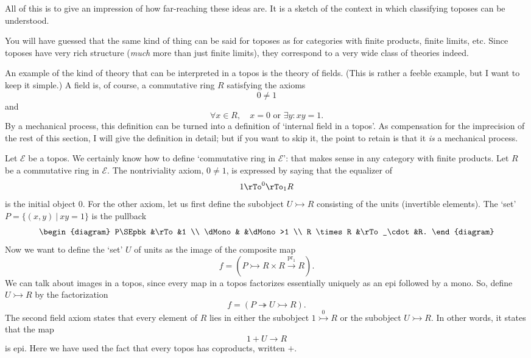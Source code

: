 \documentclass{article}
\newcommand{\cat}[1]{\mathscr{#1}}
\newcommand{\such}{\:|\:}
\newcommand{\parpair}[2]{\pile{\rTo^{\scriptstyle #1}\\ 
\rTo_{\scriptstyle #2}}}
\newcommand{\pr}{\mathrm{pr}}
\newcommand{\E}{\cat{E}}
\newcommand{\toby}[1]{\stackrel{#1}{\to}}
\newcommand{\monic}{\rightarrowtail}
\newcommand{\monicby}[1]{\stackrel{#1}{\monic}}
\newcommand{\epic}{\twoheadrightarrow}
\newcommand{\cln}{\colon}
\begin{document}
All of this is to give an impression of how far-reaching these ideas
are.  It is a sketch of the context in which classifying toposes can be
understood.

You will have guessed that the same kind of thing can be said for toposes as
for categories with finite products, finite limits, etc.  Since toposes have
very rich structure (\emph{much} more than just finite limits), they
correspond to a very wide class of theories indeed.  

An example of the kind of theory that can be interpreted in a topos is the
theory of fields.  (This is rather a feeble example, but I want to
keep it simple.)  A field is, of course, a commutative ring $R$ satisfying the
axioms 
% 
\begin{equation}        \label{eq:field-nontriv}
0 \neq 1
\end{equation}
% 
and
% 
\begin{equation}        \label{eq:field-main}
\forall x \in R, 
\quad 
x = 0 \textrm{ or } \exists y\cln xy = 1.
\end{equation}
% 
By a mechanical process, this definition can be turned into a definition of
`internal field in a topos'.  As compensation for the imprecision of the rest
of this section, I will give the definition in detail; but if you want to skip
it, the point to retain is that it \emph{is} a mechanical process.

Let $\E$ be a topos.  We certainly know how to define `commutative ring in
$\E$': that makes sense in any category with finite products.  Let $R$ be a
commutative ring in $\E$.  The nontriviality axiom, $0 \neq 1$, is expressed
by saying that 
% 
the equalizer of
\[
1 \parpair{0}{1} R
\]
is the initial object $0$.  For the other axiom, let us first define the
subobject $U \monic R$ consisting of the units (invertible elements).  The
`set' $P = \{ (x, y) \such xy = 1 \}$ is the pullback
\[
\begin{diagram}
P\SEpbk         &\rTo           &1              \\
\dMono          &               &\dMono>1       \\
R \times R      &\rTo_\cdot     &R.
\end{diagram}
\]
Now we want to define the `set' $U$ of units as the image of the composite map 
\[
f 
= 
\left(
P \monic R \times R \toby{\pr_1} R
\right).
\]
We can talk about images in a topos, since every map in a topos
factorizes essentially uniquely as an epi followed by a mono.  So, define $U
\monic R$ by the factorization
\[
f 
=
\left(
P \epic U \monic R
\right).
\]
The second field axiom states that every element of $R$ lies in either the
subobject $1 \monicby{0} R$ or the subobject $U \monic R$.  In other words, it
states that the map
\[
1 + U \to R
\]
is epi.  Here we have used the fact that every topos has coproducts, written
$+$.  
\end{document}
